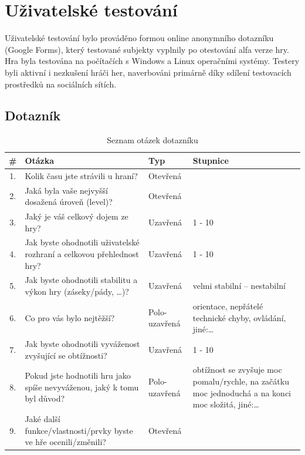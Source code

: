 \chapter{Uživatelské testování}\label{chap:Uživatelské testování}
Uživatelské testování bylo prováděno formou online anonymního dotazníku (Google Forms), který testované subjekty vyplnily po otestování alfa verze hry. Hra byla testována na počítačích s Windows a Linux operačními systémy. Testery byli aktivní i nezkušení hráči her, naverbováni primárně díky sdílení testovacích prostředků na sociálních sítích.
\section{Dotazník}

\begin{table}[h]
    \centering
    \renewcommand{\arraystretch}{1.3}
    \begin{tabularx}{\textwidth}{c|X|l|X}
    \hline
    \textbf{\#} & \textbf{Otázka} & \textbf{Typ} & \textbf{Stupnice} \\ \hline
    1. & Kolik času jste strávili u hraní? & Otevřená & \\ 
    2. & Jaká byla vaše nejvyšší dosažená úroveň (level)? & Otevřená &  \\ 
    3. & Jaký je váš celkový dojem ze hry? & Uzavřená &  1 - 10 \\ 
    4. & Jak byste ohodnotili uživatelské rozhraní a celkovou přehlednost hry? & Uzavřená & 1 - 10\\ 
    5. & Jak byste ohodnotili stabilitu a výkon hry (záseky/pády, \ldots)? & Uzavřená & velmi stabilní – nestabilní\\ 
    6. & Co pro vás bylo nejtěžší? & Polo-uzavřená & orientace, nepřátelé technické chyby, ovládání, jiné:\ldots \\ 
    7. & Jak byste ohodnotili vyváženost zvyšující se obtížnosti? & Uzavřená &  1 - 10 \\ 
    8. & Pokud jste hodnotili hru jako spíše nevyváženou, jaký k tomu byl důvod? & Polo-uzavřená & obtížnost se zvyšuje moc pomalu/rychle, na začátku moc jednoduchá a na konci moc složitá, jiné:\ldots \\ 
    9. & Jaké další funkce/vlastnosti/prvky byste ve hře ocenili/změnili? & Otevřená & \\
    \hline
    \end{tabularx}
    \caption{Seznam otázek dotazníku}
    \label{tab:questions}
\end{table}

